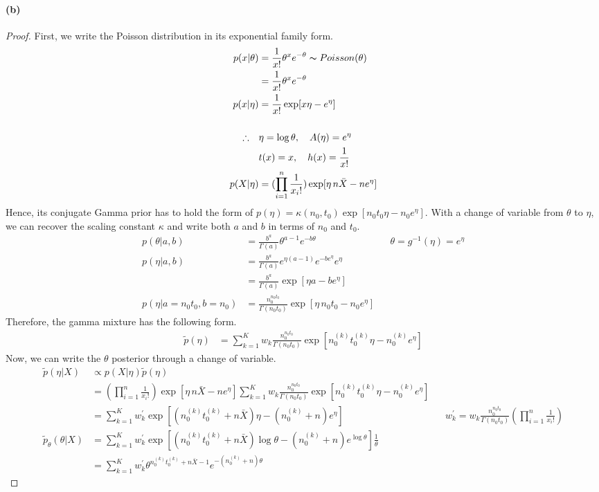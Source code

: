 \documentclass[11pt, letterpaper]{article}
\begin{document}
\paragraph{(b)}
\begin{proof}
First, we write the Poisson distribution in its exponential family form.
\begin{align*}
  p(x|\theta) &= \frac{1}{x!} \theta^x e^{-\theta} \thicksim Poisson(\theta) \\
    &= \frac{1}{x!} \theta^x e^{-\theta} \\
  p(x|\eta) &= \frac{1}{x!} \exp[x\eta - e^{\eta}] \\ \\
  \therefore \quad 
    & \eta = \log\theta, \quad A(\eta) = e^{\eta} \\
    & t(x) = x, \quad h(x) = \frac{1}{x!} \\
  p(X|\eta) &= (\prod_{i=1}^n \frac{1}{x_i !}) \exp[\eta \, n \bar{X} - n e^\eta]
\end{align*}
Hence, its conjugate Gamma prior has to hold the form of
$p(\eta) = \kappa(n_0, t_0)\exp[n_0 t_0 \eta - n_0 e^{\eta}]$.
With a change of variable from $\theta$ to $\eta$, we can recover the scaling constant $\kappa$ and write both $a$
and $b$ in terms of $n_0$ and $t_0$.
\begin{align*}
  p(\theta|a, b) &= \frac{b^a}{\Gamma(a)} \theta^{a-1} e^{-b\theta}
      && \theta = g^{-1}(\eta) = e^{\eta} \\
  p(\eta|a, b) &= \frac{b^a}{\Gamma(a)} e^{\eta(a-1)} e^{-b e^\eta} e^\eta \\
    &= \frac{b^a}{\Gamma(a)} \exp[\eta a - b e^\eta] \\
  p(\eta | a = n_0 t_0, b = n_0) &= \frac{n_0^{n_0 t_0}}{\Gamma(n_0 t_0)} \exp[\eta \, n_0 t_0 - n_0 e^\eta]
\end{align*}
Therefore, the gamma mixture has the following form.
\begin{align*}
  \tilde{p}(\eta) &= \sum_{k=1}^K w_k \frac{n_0^{n_0 t_0}}{\Gamma(n_0 t_0)} \exp[n_0^{(k)} t_0^{(k)} \eta - n_0^{(k)} e^{\eta}]
\end{align*}
Now, we can write the $\theta$ posterior through a change of variable.
\begin{align*}
  \tilde{p}(\eta|X) &\propto p(X|\eta)\tilde{p}(\eta) \\
    &= (\prod_{i=1}^n \frac{1}{x_i !}) \exp[\eta \, n \bar{X} - n e^\eta]
    \sum_{k=1}^K w_k \frac{n_0^{n_0 t_0}}{\Gamma(n_0 t_0)} \exp[n_0^{(k)} t_0^{(k)} \eta - n_0^{(k)} e^{\eta}] \\
    &= \sum_{k=1}^K w_k^{\prime} \exp[(n_0^{(k)} t_0^{(k)} + n\bar{X}) \eta - (n_0^{(k)} + n) e^{\eta}]
      && w_k^{\prime} = w_k \frac{n_0^{n_0 t_0}}{\Gamma(n_0 t_0)} (\prod_{i=1}^n \frac{1}{x_i !}) \\
  \tilde{p}_\theta(\theta|X)
    &= \sum_{k=1}^K w_k^{\prime}
      \exp[(n_0^{(k)} t_0^{(k)} + n\bar{X}) \log\theta - (n_0^{(k)} + n) e^{\log\theta}] \frac{1}{\theta} \\
    &= \sum_{k=1}^K w_k^{\prime} \theta^{n_0^{(k)} t_0^{(k)} + n\bar{X} - 1} e^{-(n_0^{(k)}+n)\theta}
\end{align*}
\end{proof}
\newpage
\end{document}
